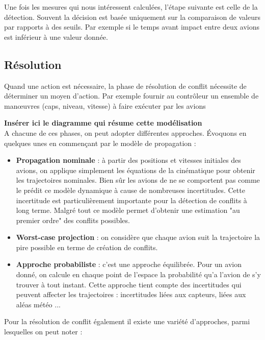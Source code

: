 Une fois les mesures qui nous intéressent calculées, l'étape suivante est celle de la détection. Souvent la décision est basée uniquement sur la comparaison de valeurs par rapports à des seuils. Par exemple si le temps avant impact entre deux avions est inférieur à une valeur donnée.

\subsection*{Résolution}

Quand une action est nécessaire, la phase de résolution de conflit nécessite de déterminer un moyen d'action. Par exemple fournir au contrôleur un ensemble de manœuvres (caps, niveau, vitesse) à faire exécuter par les avions 

\textbf{Insérer ici le diagramme qui résume cette modélisation} \\

A chacune de ces phases, on peut adopter différentes approches. Évoquons en quelques unes en commençant par le modèle de propagation : \\

\begin{itemize}
\item \textbf{Propagation nominale} : à partir des positions et vitesses initiales des avions, on applique simplement les équations de la cinématique pour obtenir les trajectoires nominales. Bien sûr les avions de ne se comportent pas comme le prédit ce modèle dynamique à cause de nombreuses incertitudes. Cette incertitude est particulièrement importante pour la détection de conflits à long terme. Malgré tout ce modèle permet d'obtenir une estimation "au premier ordre" des conflits possibles.\\
\item \textbf{Worst-case projection} : on considère que chaque avion suit la trajectoire la pire possible en terme de création de conflits. \\
\item \textbf{Approche probabiliste} : c'est une approche équilibrée. Pour un avion donné, on calcule en chaque point de l'espace la probabilité qu'a l'avion de s'y trouver à tout instant. Cette approche tient compte des incertitudes qui peuvent affecter les trajectoires : incertitudes liées aux capteurs, liées aux aléas météo ...\\
\end{itemize}

Pour la résolution de conflit également il existe une variété d'approches, parmi lesquelles on peut noter : \\

